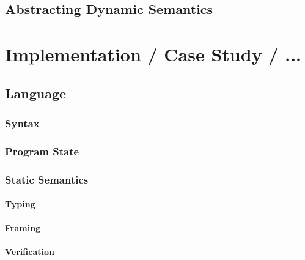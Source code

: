 \section{Abstracting Dynamic Semantics}
\label{sec:abstracting-dynamic-semantics}






\chapter{Implementation / Case Study / ...}

\section{Language}
\label{sec:language}


    \subsection{Syntax}
    \label{sec:syntax}
    
    
    \subsection{Program State}
    \label{ssec:program-state}
    
    
    \subsection{Static Semantics}
    \label{sec:static-semantics}
    
    
    \subsubsection{Typing}
    \label{sssec:typing}
    
    
    \subsubsection{Framing}
    \label{sssec:framing}
    
    
    \subsubsection{Verification}
    \label{sssec:verification}
    
    
